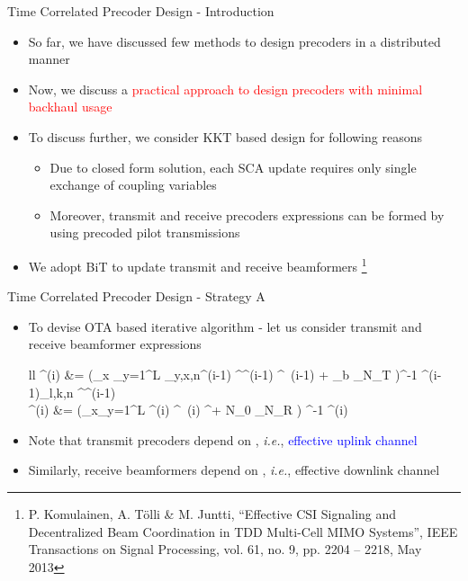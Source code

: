 \documentclass[9pt]{beamer}
\let\oldfootnote\footnote
\renewcommand\footnote[1][]{\oldfootnote[frame,#1]}
\begin{document}
\begin{frame}{Time Correlated Precoder Design - Introduction}
	\begin{itemize}
		\item So far, we have discussed few methods to design precoders in a distributed manner
		\item Now, we discuss a \textcolor{red}{practical approach to design precoders with minimal backhaul usage}
		\item To discuss further, we consider \ac{KKT} based design for following reasons
		\begin{itemize}
			\item Due to closed form solution, \textcolor[rgb]{0,0.6,0}{each \ac{SCA} update requires only single exchange of coupling variables}
			\item Moreover, transmit and receive precoders expressions can be formed by using precoded pilot transmissions
		\end{itemize}
		\item We \textcolor[rgb]{0,0,0.6}{adopt \ac{BiT}} to update transmit and receive beamformers \footnote{P. Komulainen, A. T\"olli \& M. Juntti, “Effective CSI Signaling and Decentralized Beam Coordination in TDD Multi-Cell MIMO Systems”, IEEE Transactions on Signal Processing, vol. 61, no. 9, pp. 2204 -- 2218, May 2013}
	\end{itemize}	
\end{frame}

\begin{frame}{Time Correlated Precoder Design - Strategy A}
	\begin{itemize}
		\item To devise \ac{OTA} based iterative algorithm - let us consider transmit and receive beamformer expressions
		\begin{IEEEeqnarray*}{ll}
		^{(i)} &= \Big (\displaystyle \sum_{x \in {}} \sum_{y=1}^L \alpha_{y,x,n}^{(i-1)} ^\herm {}^{(i-1)} ^{\herm \, {(i-1)}}  + \delta_b _{N_T} \Big )^{-1} \alpha^{(i-1)}_{l,k,n} ^\herm {}^{(i-1)}  \\
		^{(i)} &= \Big (\displaystyle \sum_{x\in{}}\sum_{y=1}^L  ^{(i)} ^{\herm \, (i)} ^\herm + N_0 _{N_R} \Big ) ^{-1} \;  \; ^{(i)}
		\end{IEEEeqnarray*}
		\item Note that transmit precoders  depend on , \textit{i.e.}, \textcolor{blue}{effective uplink channel}
		\item Similarly, receive beamformers  depend on , \textit{i.e.}, \textcolor[rgb]{0,0.6,0}{effective downlink channel}
	\end{itemize}	
\end{frame}
\end{document}
